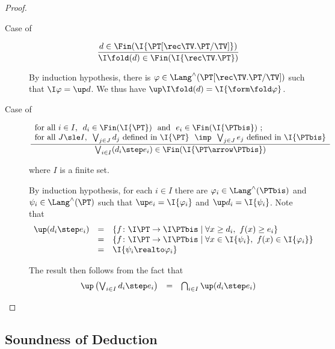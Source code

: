 \begin{proof}
\begin{description}
\item[Case of]
\[
\dfrac{d \in \Fin(\I{\PT[\rec\TV.\PT/\TV]})}
  {\I\fold(d) \in \Fin(\I{\rec\TV.\PT})}
\]

\noindent
By induction hypothesis, there is
$\varphi \in \Lang^\land(\PT[\rec\TV.\PT/\TV])$
such that $\I\varphi = \up d$.
We thus have $\up \I\fold(d) = \I{\form\fold \varphi}$.

\item[Case of]
\[
\dfrac{\begin{array}{l}
  \text{for all $i \in I$,~
  $d_i \in \Fin(\I{\PT})$
  ~and~
  $e_i \in \Fin(\I{\PTbis})$ \@;}
  \\
  \text{for all $J \sle I$,~
  $\bigvee_{j \in J} d_j$ defined in $\I{\PT}$
  ~$\imp$~
  $\bigvee_{j \in J} e_j$ defined in $\I{\PTbis}$}
  \end{array}}
  {\bigvee_{i \in I}(d_i \step e_i) \in \Fin(\I{\PT \arrow \PTbis})}
\]

\noindent
where $I$ is a finite set.

By induction hypothesis, for each $i \in I$
there are $\varphi_i \in \Lang^\land(\PTbis)$
and $\psi_i \in \Lang^\land(\PT)$
such that $\up e_i = \I{\varphi_i}$
and $\up d_i = \I{\psi_i}$.
Note that
\[
\begin{array}{l l l}
  \up(d_i \step e_i)
& =
& \left\{
  f \colon \I\PT \to \I\PTbis \mid
  \forall x \geq d_i,~
  f(x) \geq e_i
  \right\}
\\
%
& =
& \left\{
  f \colon \I\PT \to \I\PTbis \mid
  \forall x \in \I{\psi_i},~
  f(x) \in \I{\varphi_i}
  \right\}
\\
%
& =
& \I{\psi_i \realto \varphi_i}
\end{array}
\]

\noindent
The result then follows from the fact that
\[
\begin{array}{l l l}
  \up \left(
  \bigvee_{i \in I} d_i \step e_i
  \right)
& =
& \bigcap_{i \in I} \up(d_i \step e_i)
\end{array}
\]
\qedhere
\end{description}
\end{proof}



\subsection{Soundness of Deduction}
\label{sec:proof:sem:log:sound}

